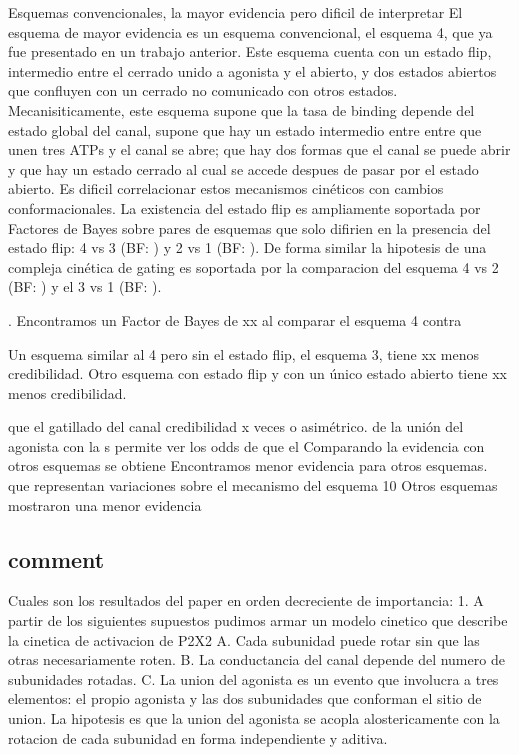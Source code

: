 \documentclass[a4paper,12pt]{article}
\begin{document}
		Esquemas convencionales, la mayor evidencia pero dificil de interpretar 
		El esquema de mayor evidencia es un esquema convencional, el esquema 4, que ya fue presentado en un trabajo anterior. Este esquema cuenta con un estado flip, intermedio entre el cerrado unido a agonista y el abierto, y dos estados abiertos que confluyen con un cerrado no comunicado con otros estados.
		Mecanisiticamente, este esquema supone que la tasa de binding depende del estado global del canal, supone que hay un estado intermedio entre entre que unen tres ATPs y el canal se abre; que hay dos formas que el canal se puede abrir y que hay un estado cerrado al cual se accede despues de pasar por el estado abierto. Es dificil correlacionar estos mecanismos cinéticos con cambios conformacionales. 
		La existencia del estado flip es ampliamente soportada por Factores de Bayes sobre pares de esquemas que solo difirien en la presencia del estado flip: 4 vs 3 (BF:  ) y 2 vs 1 (BF:  ). 
		De forma similar la hipotesis de una compleja cinética de gating es soportada por la comparacion del esquema 4 vs 2  (BF:  ) y el 3 vs 1 (BF: ). 
		
		
		
		. Encontramos un Factor de Bayes de xx al comparar el esquema 4 contra
		
		Un esquema similar al 4 pero sin el estado flip, el esquema 3,  tiene  xx menos credibilidad. Otro esquema con estado flip y con un único estado abierto tiene xx menos credibilidad. 
		
		
		que el gatillado del canal
		credibilidad x veces o asimétrico. de la unión del agonista con la s
		permite ver los odds de que el 
		Comparando la evidencia con otros esquemas se obtiene 
		Encontramos menor evidencia para otros esquemas. 
		que representan variaciones sobre el mecanismo del esquema 10 
		Otros esquemas mostraron una menor evidencia
		
		
	
	
	\subsection{comment}
		
		
		Cuales son los resultados del paper en orden decreciente de importancia:
		1. A partir de los siguientes supuestos pudimos armar un modelo cinetico que describe la cinetica de activacion de P2X2 
		A. Cada subunidad puede rotar sin que las otras necesariamente roten. 
		B. La conductancia del canal depende del numero de subunidades rotadas. 
		C. La union del agonista es un evento que involucra a tres elementos: el propio agonista y las dos subunidades que conforman el sitio de union. La hipotesis es que la union del agonista se acopla alostericamente con la rotacion de cada subunidad en forma independiente y aditiva. 
		
\end{document}
